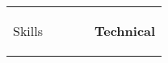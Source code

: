 \documentclass[hidelinks, 12pt, a4paper]{article}
\begin{document}
	
%		
%		
%		
%
%
%		
%		
%		
%		
%		


	\vspace{24pt}
	\begin{tabularx}{\textwidth}{@{}llXrr@{}}
		\begin{Large}Skills\end{Large}&
		\rule{80pt}{1pt}&&
		\rule{63pt}{1pt}&
		\textbf{Technical}
	\end{tabularx}\\
	
\end{document}
